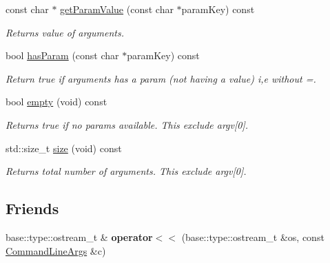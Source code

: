 \begin{DoxyCompactItemize}
const char $\ast$ \hyperlink{classel_1_1base_1_1utils_1_1_command_line_args_ae73303db2f3001842ac094ebd0b28d3f}{get\+Param\+Value} (const char $\ast$param\+Key) const
\begin{DoxyCompactList}\small\item\em Returns value of arguments. \end{DoxyCompactList}\item 
\mbox{\label{classel_1_1base_1_1utils_1_1_command_line_args_a77ceaf1c151c30f6362cfbac5ddbdaa6}} 
bool \hyperlink{classel_1_1base_1_1utils_1_1_command_line_args_a77ceaf1c151c30f6362cfbac5ddbdaa6}{has\+Param} (const char $\ast$param\+Key) const
\begin{DoxyCompactList}\small\item\em Return true if arguments has a param (not having a value) i,e without \textquotesingle{}=\textquotesingle{}. \end{DoxyCompactList}\item 
\mbox{\label{classel_1_1base_1_1utils_1_1_command_line_args_ae00284742272d75321a2e8ebe232b963}} 
bool \hyperlink{classel_1_1base_1_1utils_1_1_command_line_args_ae00284742272d75321a2e8ebe232b963}{empty} (void) const
\begin{DoxyCompactList}\small\item\em Returns true if no params available. This exclude argv\mbox{[}0\mbox{]}. \end{DoxyCompactList}\item 
\mbox{\label{classel_1_1base_1_1utils_1_1_command_line_args_a1f7125d74bf8e88d0e51dd6d12af0000}} 
std\+::size\+\_\+t \hyperlink{classel_1_1base_1_1utils_1_1_command_line_args_a1f7125d74bf8e88d0e51dd6d12af0000}{size} (void) const
\begin{DoxyCompactList}\small\item\em Returns total number of arguments. This exclude argv\mbox{[}0\mbox{]}. \end{DoxyCompactList}\end{DoxyCompactItemize}
\subsection*{Friends}
\begin{DoxyCompactItemize}
\item 
\mbox{\label{classel_1_1base_1_1utils_1_1_command_line_args_aee5ba4c037136cd1d54026dd75927b10}} 
base\+::type\+::ostream\+\_\+t \& {\bfseries operator$<$$<$} (base\+::type\+::ostream\+\_\+t \&os, const \hyperlink{classel_1_1base_1_1utils_1_1_command_line_args}{Command\+Line\+Args} \&c)
\end{DoxyCompactItemize}


